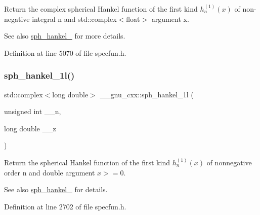 Return the complex spherical Hankel function of the first kind $ h^{(1)}_n(x) $ of non-\/negative integral {\ttfamily n} and {\ttfamily std\+::complex$<$float$>$} argument {\ttfamily x}.

\begin{DoxySeeAlso}{See also}
\hyperlink{group__mathsf__gnu_ga4424f565fb224ab88b177beb65d08305}{sph\+\_\+hankel\+\_} for more details. 
\end{DoxySeeAlso}


Definition at line 5070 of file specfun.\+h.

\mbox{\label{group__mathsf__gnu_ga6e77fd5cddfbd57d9120b20fc6c30e6f}} 
\subsubsection{\texorpdfstring{sph\+\_\+hankel\+\_\+1l()}{sph\_hankel\_1l()}\hspace{0.1cm}{\footnotesize\ttfamily [1/2]}}
{\footnotesize\ttfamily std\+::complex$<$long double$>$ \+\_\+\+\_\+gnu\+\_\+cxx\+::sph\+\_\+hankel\+\_\+1l (\begin{DoxyParamCaption}\item[{unsigned int}]{\+\_\+\+\_\+n,  }\item[{long double}]{\+\_\+\+\_\+z }\end{DoxyParamCaption})\hspace{0.3cm}{\ttfamily [inline]}}

Return the spherical Hankel function of the first kind $ h^{(1)}_n(x) $ of nonnegative order n and { double} argument $ x >= 0 $.

\begin{DoxySeeAlso}{See also}
\hyperlink{group__mathsf__gnu_ga4424f565fb224ab88b177beb65d08305}{sph\+\_\+hankel\+\_} for details. 
\end{DoxySeeAlso}


Definition at line 2702 of file specfun.\+h.

\mbox{\label{group__mathsf__gnu_ga3e9d889d8f2e4792e892b12b1f5948b9}} 
